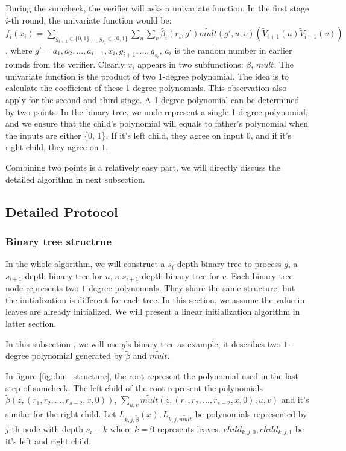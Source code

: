 During the sumcheck, the verifier will asks a univariate function. In the first stage $i$-th round, the univariate function would be: $f_i(x_i)=\sum_{g_{i+1} \in \{0, 1\}, ..., g_{s_{i}} \in \{0, 1\}} \sum_{u} \sum_{v} \tilde{\beta_{i}}(r_i, g')\tilde{mult}(g', u, v)(\tilde{V}_{i+1}(u)\tilde{V}_{i+1}(v))$, where $g' = a_1, a_2, ..., a_{i-1}, x_{i}, g_{i+1}, ..., g_{s_i}$, $a_i$ is the random number in earlier rounds from the verifier. Clearly $x_i$ appears in two subfunctions: $\tilde{\beta}$, $\tilde{mult}$. The univariate function is the product of two 1-degree polynomial. The idea is to calculate the coefficient of these 1-degree polynomials. This observation also apply for the second and third stage. A 1-degree polynomial can be determined by two points. In the binary tree, we node represent a single 1-degree polynomial, and we ensure that the child's polynomial will equals to father's polynomial when the inputs are either \{0, 1\}. If it's left child, they agree on input $0$, and if it's right child, they agree on $1$.

Combining two points is a relatively easy part, we will directly discuss the detailed algorithm in next subsection.

\subsection{Detailed Protocol}
\subsubsection{Binary tree structrue}
In the whole algorithm, we will construct a $s_i$-depth binary tree to process $g$, a $s_{i+1}$-depth binary tree for $u$, a $s_{i+1}$-depth binary tree for $v$. Each binary tree node represents two $1$-degree polynomials. They share the same structure, but the initialization is different for each tree. In this section, we assume the value in leaves are already initialized. We will present a linear initialization algorithm in latter section.

In this subsection , we will use $g$'s binary tree as example, it describes two $1$-degree polynomial generated by $\tilde{\beta}$ and $\tilde{mult}$.

In figure \ref{fig::bin_structure}, the root represent the polynomial used in the last step of sumcheck. The left child of the root represent the polynomials $\tilde{\beta}(z, (r_1, r_2, ..., r_{s-2}, x, 0))$, $\sum_{u, v}\tilde{mult}(z, (r_1, r_2, ..., r_{s-2}, x, 0), u, v)$ and it's similar for the right child. Let $L_{k, j, \tilde{\beta}}(x), L_{k, j, \tilde{mult}}$ be polynomials represented by $j$-th node with depth $s_i - k$ where $k=0$ represents leaves. $child_{k, j, 0}, child_{k, j, 1}$ be it's left and right child. 

